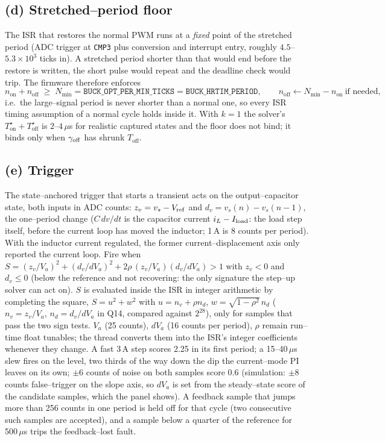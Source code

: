 \documentclass[11pt]{article}
\newcommand{\Ton}{T_{\mathrm{on}}}
\newcommand{\Toff}{T_{\mathrm{off}}}
\begin{document}
\subsection*{(d) Stretched--period floor}
The ISR that restores the normal PWM runs at a \emph{fixed} point of the
stretched period (ADC trigger at \texttt{CMP3} plus conversion and interrupt
entry, roughly $4.5$--$5.3\times10^3$ ticks in). A stretched period shorter than
that would end before the restore is written, the short pulse would repeat and
the deadline check would trip. The firmware therefore enforces
\begin{equation}
n_{\mathrm{on}}+n_{\mathrm{off}}\;\ge\;N_{\min}
=\texttt{BUCK\_OPT\_PER\_MIN\_TICKS}=\texttt{BUCK\_HRTIM\_PERIOD},
\qquad n_{\mathrm{off}}\leftarrow N_{\min}-n_{\mathrm{on}}\ \text{if needed},
\end{equation}
i.e.\ the large--signal period is never shorter than a normal one, so every ISR
timing assumption of a normal cycle holds inside it. With $k=1$ the solver's
$\Ton^\star+\Toff^\star$ is $2$--$4\,\mu$s for realistic captured states and the
floor does not bind; it binds only when $\gamma_{\rm off}$ has shrunk $\Toff$.

\subsection*{(e) Trigger}
The state--anchored trigger that starts a transient acts on the output--capacitor
state, both inputs in ADC counts: $z_v=v_s-V_{\rm ref}$ and $d_v=v_s(n)-v_s(n-1)$,
the one--period change ($C\,dv/dt$ is the capacitor current $i_L-I_{\rm load}$: the
load step itself, before the current loop has moved the inductor; 1\,A is 8 counts
per period). With the inductor current regulated, the former current--displacement
axis only reported the current loop. Fire when
$S=(z_v/V_a)^2+(d_v/dV_a)^2+2\rho\,(z_v/V_a)(d_v/dV_a)>1$ with $z_v<0$ and $d_v\le0$
(below the reference and not recovering: the only signature the step--up solver
can act on). $S$ is evaluated inside the ISR in integer arithmetic by completing
the square, $S=u^2+w^2$ with $u=n_v+\rho n_d$, $w=\sqrt{1-\rho^2}\,n_d$ ($n_v=z_v/V_a$,
$n_d=d_v/dV_a$ in Q14, compared against $2^{28}$), only for samples that pass the
two sign tests. $V_a$ (25 counts), $dV_a$ (16 counts per period), $\rho$ remain
run--time float tunables; the thread converts them into the ISR's integer
coefficients whenever they change. A fast 3\,A step scores 2.25 in its first period;
a 15--40\,$\mu$s slew fires on the level, two thirds of the way down the dip the
current--mode PI leaves on its own; $\pm6$ counts of noise on both samples score
0.6 (simulation: $\pm8$ counts false--trigger on the slope axis, so $dV_a$ is set
from the steady--state score of the candidate samples, which the panel shows). A feedback sample that jumps more than 256 counts in one period is
held off for that cycle (two consecutive such samples are accepted), and a sample
below a quarter of the reference for 500\,$\mu$s trips the feedback--lost fault.
\end{document}

